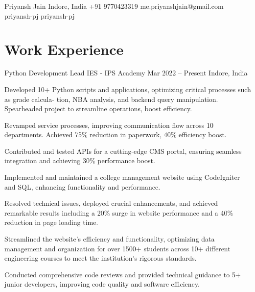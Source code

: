 \documentclass[letterpaper]{config}
\begin{document}
\Header
    {Priyansh Jain} %
    {Indore, India}
    {+91 9770423319} %
    {me.priyanshjain@gmail.com} %
    {priyansh-pj} %
    {priyansh-pj}

\section{Work Experience}
\WorkExperience
    {Python Development Lead} %
    {IES - IPS Academy} %
    {Mar 2022 -- Present} %
    {Indore, India} %
    {
        \item Developed 10+ Python scripts and applications, optimizing critical processes such as grade calcula-
tion, NBA analysis, and backend query manipulation. Spearheaded project to streamline operations, boost efficiency.
        \item Revamped service processes, improving communication flow across 10 departments. Achieved 75\% reduction in paperwork, 40\% efficiency boost.
        \item Contributed and tested APIs for a cutting-edge CMS portal, ensuring seamless integration and achieving 30\% performance boost.
        \item Implemented and maintained a college management website using CodeIgniter and SQL, enhancing functionality and performance.
        \item Resolved technical issues, deployed crucial enhancements, and achieved remarkable results including a 20\% surge in website performance and a 40\% reduction in page loading time.
        \item Streamlined the website’s eﬀiciency and functionality, optimizing data management and organization for over 1500+ students across 10+ different engineering courses to meet the institution’s rigorous standards.
        \item Conducted comprehensive code reviews and provided technical guidance to 5+ junior developers, improving code quality and software efficiency.
    } 
    
\end{document}
